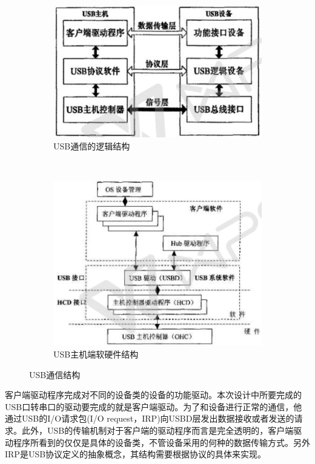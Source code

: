 \begin{figure}[h]
\centering
  \begin{subfigure}[b]{0.4\textwidth}
  \includegraphics[width=1.0\textwidth]{./graphics/USB-device-structure-diagram.pdf}
  \caption{USB通信的逻辑结构}\label{fig:usb通信逻辑结构}
  \end{subfigure}
  ~
  \begin{subfigure}[b]{0.5\textwidth}
  \includegraphics[width=1.0\textwidth]{./graphics/USB-PC-structure.pdf}
  \caption{USB主机端软硬件结构}\label{fig:usb-PC}
  \end{subfigure}
\caption{USB通信结构}\label{fig:USB通信结构}
\end{figure}

	客户端驱动程序完成对不同的设备类的设备的功能驱动。本次设计中所要完成的USB口转串口的驱动要完成的就是客户端驱动。为了和设备进行正常的通信，他通过USB的I/O请求包(I/O request，IRP)向USBD层发出数据接收或者发送的请求。此外，USB的传输机制对于客户端的驱动程序而言是完全透明的，客户端驱动程序所看到的仅仅是具体的设备类，不管设备采用的何种的数据传输方式。另外IRP是USB协议定义的抽象概念，其结构需要根据协议的具体来实现。
	
